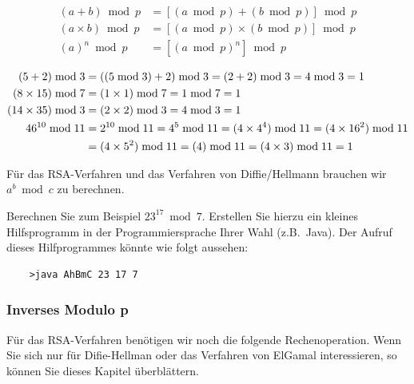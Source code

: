 \begin{align}
    \label{eq:mod}
    (a + b) \bmod p &= [(a \bmod p) + (b \bmod p)] \bmod p             \\
    (a \times b) \bmod p &= [(a \bmod p) \times (b \bmod p)] \bmod p   \\
    (a)^n \bmod p &= [(a \bmod p)^n] \bmod p
\end{align}

\begin{beispiel}
    \label{ex:modulo}
\end{beispiel}


\begin{align*}
    (5 + 2)\bmod 3 &= ((5\bmod 3) + 2) \bmod 3 = (2 + 2) \bmod 3 = 4 \bmod 3 = 1 \\
    (8 \times 15) \bmod 7 &= (1 \times 1) \bmod 7 = 1 \bmod 7 = 1              \\
    (14 \times 35) \bmod 3 &= (2 \times 2) \bmod 3 = 4 \bmod 3 = 1             \\
    46^{10} \bmod 11 &= 2^{10} \bmod 11 = 4^5 \bmod 11 = (4\times 4^4) \bmod 11 = (4\times 16^2) \bmod 11 \\
    &= (4\times 5^2) \bmod 11 = (4\time 25) \bmod 11 = (4\times 3) \bmod 11 = 1
\end{align*}

\begin{bemerkung}[RSA]
    Für das RSA-Verfahren 
    und das Verfahren von Diffie/Hellmann 
    brauchen wir $a^b \bmod c$ zu berechnen.
\end{bemerkung}

\begin{Exercise}[%
title={Modulo Berechnung},
label={exercise:modulo}]
\end{Exercise}
Berechnen Sie zum Beispiel $23^{17} \bmod 7$. Erstellen Sie hierzu ein kleines
Hilfsprogramm in der Programmiersprache Ihrer Wahl (z.B.~Java). Der Aufruf dieses
Hilfprogrammes könnte wie folgt aussehen:
\begin{verbatim}
    >java AhBmC 23 17 7
\end{verbatim}


\subsubsection*{Inverses Modulo p}

Für das RSA-Verfahren benötigen wir noch die folgende Rechenoperation.
Wenn Sie sich nur für Difie-Hellman oder das Verfahren von ElGamal
interessieren, so können Sie dieses Kapitel überblättern.


